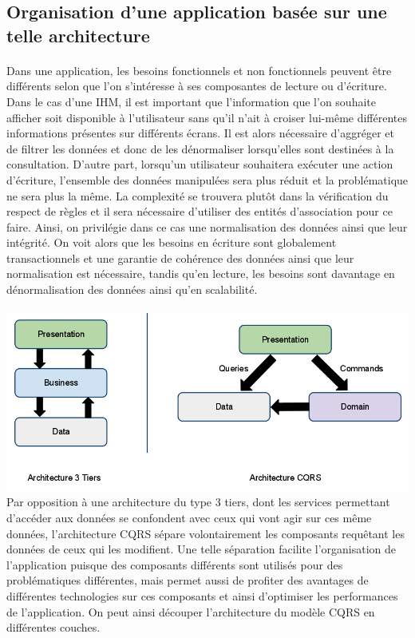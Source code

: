 \subsection{Organisation d'une application basée sur une telle architecture}
\paragraph{}
Dans une application, les besoins fonctionnels et non fonctionnels peuvent être différents selon que l'on s'intéresse à ses composantes de lecture ou d'écriture.
Dans le cas d'une IHM, il est important que l'information que l'on souhaite afficher soit disponible à l'utilisateur sans qu'il n'ait à croiser lui-même différentes informations présentes sur différents écrans.
Il est alors nécessaire d'aggréger et de filtrer les données et donc de les dénormaliser lorsqu'elles sont destinées à la consultation.
D'autre part, lorsqu'un utilisateur souhaitera exécuter une action d'écriture, l'ensemble des données manipulées sera plus réduit et la problématique ne sera plus la même.
La complexité se trouvera plutôt dans la vérification du respect de règles et il sera nécessaire d'utiliser des entités d'association pour ce faire.
Ainsi, on privilégie dans ce cas une normalisation des données ainsi que leur intégrité.
On voit alors que les besoins en écriture sont globalement transactionnels et une garantie de cohérence des données ainsi que leur normalisation est nécessaire, tandis qu'en lecture, les besoins sont davantage en dénormalisation des données ainsi qu'en scalabilité.
\paragraph{}
\includegraphics[scale=0.4]{Figures/Chapter3/architecture/tiersvscqrs.png}
Par opposition à une architecture du type 3 tiers, dont les services permettant d'accéder aux données se confondent avec ceux qui vont agir sur ces même données, l'architecture CQRS sépare volontairement les composants requêtant les données de ceux qui les modifient.
Une telle séparation facilite l'organisation de l'application puisque des composants différents sont utilisés pour des problématiques différentes, mais permet aussi de profiter des avantages de différentes technologies sur ces composants et ainsi d'optimiser les performances de l'application.
On peut ainsi découper l'architecture du modèle CQRS en différentes couches.

